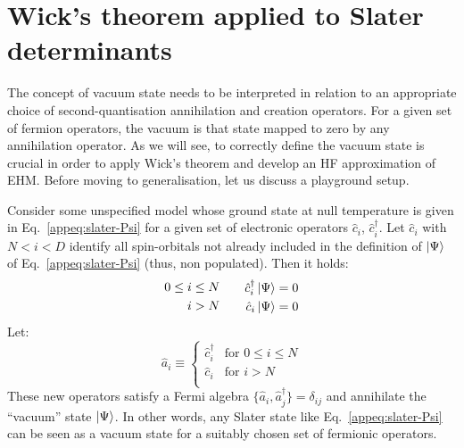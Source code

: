 \section{Wick's theorem applied to Slater determinants}\label{appsec:slater-wick}

The concept of vacuum state needs to be interpreted in relation to an appropriate choice of second-quantisation annihilation and creation operators. For a given set of fermion operators, the vacuum is that state mapped to zero by any annihilation operator. As we will see, to correctly define the vacuum state is crucial in order to apply Wick's theorem and develop an HF approximation of EHM. Before moving to generalisation, let us discuss a playground setup.

Consider some unspecified model whose ground state at null temperature is given in Eq.~\eqref{appeq:slater-Psi} for a given set of electronic operators $\hat c_i$, $\hat c_i^\dagger$. Let $\hat c_i$ with $N <i < D$ identify all spin-orbitals not already included in the definition of $\ket{\Psi}$ of Eq.~\eqref{appeq:slater-Psi} (thus, non populated). Then it holds:
\[
	\begin{aligned}
		0\le i &\le N \\
		i &> N
	\end{aligned}
	\qquad
	\begin{aligned}
		\hat c_i^\dagger \ket{\Psi} &= 0 \\
		\hat c_i \ket{\Psi} &= 0
	\end{aligned}
\]
Let:
\[
	\hat a_i \equiv \begin{cases}
		\hat c_i^\dagger &\text{for $0\le i \le N$} \\
		\hat c_i &\text{for $i > N$} \\
	\end{cases}
\]
These new operators satisfy a Fermi algebra $\lbrace \hat a_i , \hat a_j^\dagger \rbrace = \delta_{ij}$ and annihilate the ``vacuum'' state $\ket{\Psi}$. In other words, any Slater state like Eq.~\eqref{appeq:slater-Psi} can be seen as a vacuum state for a suitably chosen set of fermionic operators.

